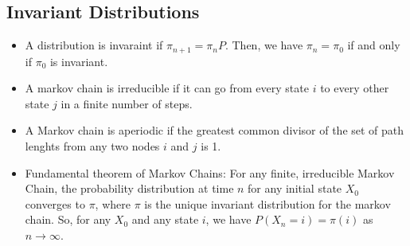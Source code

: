 \documentclass[10pt]{article}
\begin{document}
	\subsection{Invariant Distributions}
	\begin{itemize}
		\item A distribution is invaraint if \( \pi_{n+1} = \pi_n P \). Then, we have \( \pi_n = \pi_0 \) if and only if 
			\( \pi_0 \) is invariant. 
		\item A markov chain is irreducible if it can go from every state \( i \) to every other state \( j \) 
			in a finite number of steps. 
		\item A Markov chain is aperiodic if the greatest common divisor of the set of path lenghts from any two 
			nodes \( i \) and \( j \) is 1. 
		\item Fundamental theorem of Markov Chains: For any finite, irreducible Markov Chain, the probability 
			distribution at time \( n \) for any initial state \( X_0 \) converges to \( \pi \), where \( \pi \) is the 
			unique invariant distribution for the markov chain. So, for any \( X_0 \) and any state \( i \), 
			we have \( P(X_n = i) = \pi(i) \) as \( n\to \infty \).
	\end{itemize}
\end{document}
